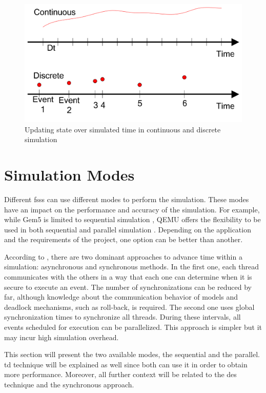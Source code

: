 \begin{figure}[H]
	\centering
 	\includegraphics[width=0.7\linewidth]{Images/DesVsCes.png}
 	\caption{Updating state over simulated time in continuous and discrete simulation \cite{helal2008hybrid}}
	 \label{fig_DesVsCes}
\end{figure}


\section{Simulation Modes}

Different \glspl{fss} can use different modes to perform the simulation. These modes have an impact on the performance and accuracy of the 
simulation. For example, while Gem5 is limited to sequential simulation \cite{TheGem5Simulator}, QEMU offers the flexibility to be used in both 
sequential and parallel simulation \cite{QEMUDoc}. Depending on the application and the requirements of the project, one option can be better 
than another.

According to \cite{parallelTypes}, there are two dominant approaches to advance time within a simulation: asynchronous and synchronous methods. 
In the first one, each thread communicates with the others in a way that each one can determine when it is secure to execute an event. The number 
of synchronizations can be reduced by far, although knowledge about the communication behavior of models and deadlock mechanisms, such as 
roll-back, is required. The second one uses global synchronization times to synchronize all threads. During these intervals, all events scheduled 
for execution can be parallelized. This approach is simpler but it may incur high simulation overhead.

This section will present the two available modes, the sequential and the parallel. \gls{td} technique will be explained as well 
since both can use it in order to obtain more performance. Moreover, all further context will be related to 
the \gls{des} technique and the synchronous approach.

